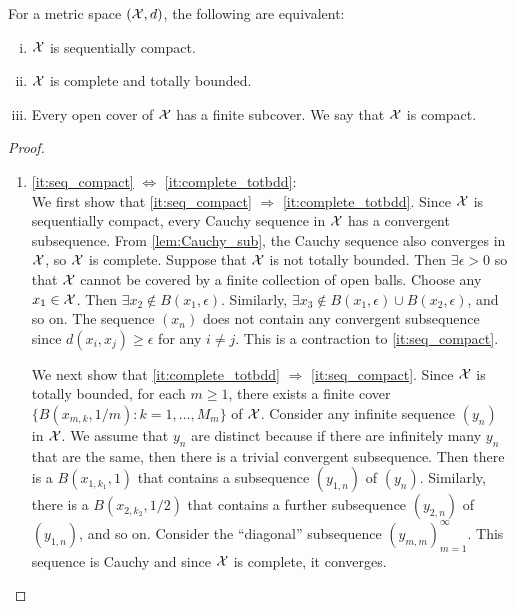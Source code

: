 \documentclass[12pt]{article}
\begin{document}
\begin{Theorem}\label{wk1:thm:compact}
For a metric space $(\mathcal{X}, d)$, the following are equivalent:
\begin{enumerate}[(i)]
\item\label{it:seq_compact} $\mathcal{X}$ is sequentially compact.
\item\label{it:complete_totbdd} $\mathcal{X}$ is complete and totally bounded.
\item\label{it:compact} Every open cover of $\mathcal{X}$ has a finite subcover. We say that $\mathcal{X}$ is compact.
\end{enumerate}
\end{Theorem}
\begin{proof}\
\begin{enumerate}[1)]
\item \ref{it:seq_compact} $\Leftrightarrow$ \ref{it:complete_totbdd}:\\
We first show that \ref{it:seq_compact} $\Rightarrow$ \ref{it:complete_totbdd}. Since $\mathcal{X}$ is sequentially compact, every Cauchy sequence in $\mathcal{X}$ has a convergent subsequence. From \cref{lem:Cauchy_sub}, the Cauchy sequence also converges in $\mathcal{X}$, so $\mathcal{X}$ is complete. Suppose that $\mathcal{X}$ is not totally bounded. Then $\exists \epsilon >0$ so that $\mathcal{X}$ cannot be covered by a finite collection of open balls. Choose any $x_1\in\mathcal{X}$. Then $\exists x_2\notin B(x_1,\epsilon)$. Similarly, $\exists x_3\notin B(x_1,\epsilon)\cup B(x_2,\epsilon)$, and so on. The sequence $(x_n)$ does not contain any convergent subsequence since $d(x_i,x_j)\geq\epsilon$ for any $i\ne j$. This is a contraction to \ref{it:seq_compact}.

We next show that \ref{it:complete_totbdd} $\Rightarrow$ \ref{it:seq_compact}. Since $\mathcal{X}$ is totally bounded, for each $m\geq 1$, there exists a finite cover $\{B(x_{m,k}, 1/m): k=1,\ldots,M_m\}$ of $\mathcal{X}$. Consider any infinite sequence $(y_n)$ in $\mathcal{X}$. We assume that $y_n$ are distinct because if there are infinitely many $y_n$ that are the same, then there is a trivial convergent subsequence. Then there is a $B(x_{1,k_1},1)$ that contains a subsequence $(y_{1,n})$ of $(y_n)$. Similarly, there is a $B(x_{2,k_2},1/2)$ that contains a further subsequence $(y_{2,n})$ of $(y_{1,n})$, and so on. Consider the ``diagonal'' subsequence $(y_{m,m})_{m=1}^\infty$. This sequence is Cauchy and since $\mathcal{X}$ is complete, it converges.



\end{enumerate}
\end{proof}
\end{document}
